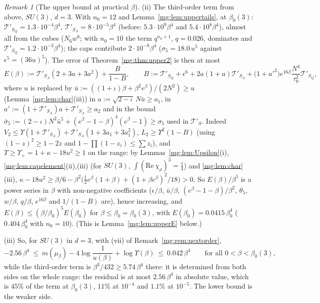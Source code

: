 \documentclass[11pt,a4paper]{article}
\theoremstyle{definition}
\theoremstyle{remark}
\newtheorem{remark}[theorem]{Remark}
\begin{document}
\begin{remark}[The upper bound at practical $\beta$]
(ii) The third-order term from above, $SU(3)$, $d=3$. With $n_0=12$ and Lemma~\ref{mg:lem:uppertails}, at $\beta_0(3)$: $\mathcal T'_{S_Q}=1.3\cdot10^{-4}\beta^4$, $\mathcal T'_{S_A}=8\cdot10^{-5}\beta^4$
(before: $5.3\cdot10^9\beta^4$ and $5.4\cdot10^8\beta^4$), almost all from the cubes ($N_6w^6$; with $n_0=10$ the term $q^{n_0+1}$, $q=0.026$, dominates and $\mathcal T'_{S_Q}=1.2\cdot10^{-3}\beta^4$);
the caps contribute $2\cdot10^{-8}\beta^4$ ($\sigma_5=18.0\,u^5$ against $\epsilon^5=(36u)^5$). The error of Theorem~\ref{mg:thm:upper2} is then at most
\[
E(\beta):=\mathcal T'_{S_A}(2+3a+3a^2)+\frac B{1-B},\qquad B:=\mathcal T'_{S_Q}+\epsilon^6+2a(1+a)\mathcal T'_{S_A}+\bigl(1+a'^2\bigr)e^{16\beta}\frac{N^4}{\tau_0^2}\mathcal T'_{S_Q},
\]
where $u$ is replaced by $\bar u:=((1+\iota)\beta+\beta^2e^\beta)/(2N^2)\ge u$ (Lemma~\ref{mg:lem:char}(iii)) in $a:=\sqrt{2-\iota}\,N\bar u\ge a_1$, in $a':=(1+\mathcal T'_{S_A})a+\mathcal T'_{S_A}\ge a_2$ and in
the bound $\bar\sigma_5:=(2-\iota)N^2\bar u^5+(e^\beta-1-\beta)^4(e^\beta-1)\ge\sigma_5$ used in $\mathcal T'_S$. Indeed $V_2\le\Upsilon(1+\mathcal T'_{S_A})+\mathcal T'_{S_A}(1+3a_1+3a_1^2)$, $L_2\ge\Upsilon^2(1-B)$ (using
$(1-z)^2\ge1-2z$ and $1-\prod(1-z_i)\le\sum z_i$), and $\Upsilon\ge\Upsilon_+=1+\kappa-18u^2\ge1$ on the range: by Lemmas~\ref{mg:lem:Upsilon}(i), \ref{mg:lem:capelement}(ii),(iii) (for $SU(3)$,
$\int(\mathrm{Re}\,\chi_\rho)^3=\frac14$) and \ref{mg:lem:char}(iii), $\kappa-18u^2\ge\beta/6-\beta^2\bigl(\frac12e^\beta(1+\beta)+(1+\beta e^\beta)^2/18\bigr)>0$. So $E(\beta)/\beta^5$ is a power series in $\beta$ with
non-negative coefficients ($\epsilon/\beta$, $\bar u/\beta$, $(e^\beta-1-\beta)/\beta^2$, $\theta_5$, $w/\beta$, $q/\beta$, $e^{16\beta}$ and $1/(1-B)$ are), hence increasing, and
$E(\beta)\le(\beta/\beta_0)^5E(\beta_0)$ for $\beta\le\beta_0=\beta_0(3)$, with $E(\beta_0)=0.0415\,\beta_0^4$ ($0.404\,\beta_0^4$ with $n_0=10$). (This is Lemma~\ref{mg:lem:upperE} below.)

(iii) So, for $SU(3)$ in $d=3$, with (vii) of Remark~\ref{mg:rem:nextorder},
\[
-2.56\,\beta^4\ \le\ m(\mu_\beta)-4\log\frac1{u(\beta)}+\log\Upsilon(\beta)\ \le\ 0.042\,\beta^4\qquad\text{for all }0<\beta<\beta_0(3),
\]
while the third-order term is $\beta^3/432\ge5.74\,\beta^4$ there: it is determined from both sides on the whole range: the residual is at most $2.56\,\beta^4$ in absolute value, which is $45\%$ of the term
at $\beta_0(3)$, $11\%$ at $10^{-4}$ and $1.1\%$ at $10^{-5}$. The lower bound is the weaker side.


\end{remark}
\end{document}
